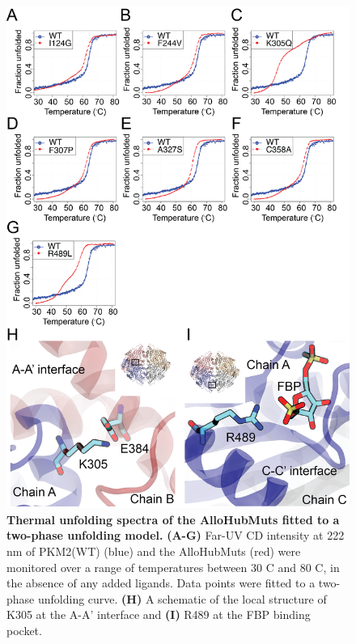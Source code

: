 \begin{figure}[!ht]
\includegraphics[scale=0.7]{ch7_fig3_unfolding_apo.png}
\caption[Thermal unfolding spectra of the AlloHubMuts fitted to a two-phase unfolding model.] {\textbf{Thermal unfolding spectra of the AlloHubMuts fitted to a two-phase unfolding model.} \textbf{(A-G)} Far-UV CD intensity at 222 nm of PKM2(WT) (blue) and the AlloHubMuts (red) were monitored over a range of temperatures between 30 \textdegree C and 80 \textdegree C, in the absence of any added ligands. Data points were fitted to a two-phase unfolding curve. \textbf{(H)} A schematic of the local structure of K305 at the A-A' interface and \textbf{(I)} R489 at the FBP binding pocket.}
\label{fig:unfolding_apo}
\end{figure}
%
%
\clearpage

